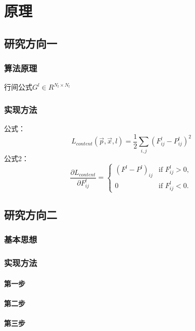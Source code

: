 \newpage
\chapter{原理}

\section{研究方向一}
\subsection{算法原理}
行间公式$G^l \in R^{N_l \times N_l}$
\subsection{实现方法}
公式：
\[
L_{content}(\vec{p},\vec{x},l) = \frac{1}{2}\sum_{i,j}(F^l_{ij} - P^l_{ij})^{2} \tag{1}
\]
公式2：
\[
\frac{\partial{L_{content}}}{\partial{F^l_{ij}}} = 
\begin{cases}
(F^l - P^l)_{ij} & \text{if } {F^l_{ij}} > 0,\\
0 & \text{if } {F^l_{ij}} < 0.
\end{cases} \tag{2}
\]
\par
\section{研究方向二}
\subsection{基本思想}

\subsection{实现方法}
\subsubsection{第一步}

\subsubsection{第二步}

\subsubsection{第三步}













